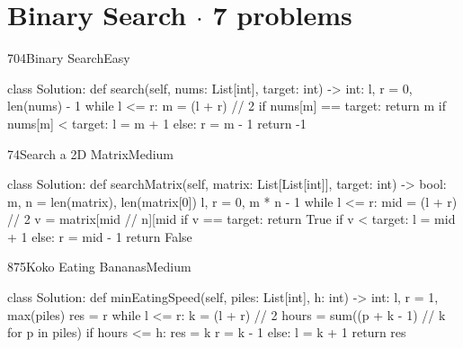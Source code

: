 \section{Binary Search {\normalsize\color{muted}$\cdot$ 7 problems}}

\begin{problem}{704}{Binary Search}{Easy}
\begin{code}
class Solution:
    def search(self, nums: List[int], target: int) -> int:
        l, r = 0, len(nums) - 1
        while l <= r:
            m = (l + r) // 2
            if nums[m] == target:
                return m
            if nums[m] < target:
                l = m + 1
            else:
                r = m - 1
        return -1
\end{code}
\end{problem}

\begin{problem}{74}{Search a 2D Matrix}{Medium}
\begin{code}
class Solution:
    def searchMatrix(self, matrix: List[List[int]], target: int) -> bool:
        m, n = len(matrix), len(matrix[0])
        l, r = 0, m * n - 1
        while l <= r:
            mid = (l + r) // 2
            v = matrix[mid // n][mid %
            if v == target:
                return True
            if v < target:
                l = mid + 1
            else:
                r = mid - 1
        return False
\end{code}
\end{problem}

\begin{problem}{875}{Koko Eating Bananas}{Medium}
\begin{code}
class Solution:
    def minEatingSpeed(self, piles: List[int], h: int) -> int:
        l, r = 1, max(piles)
        res = r
        while l <= r:
            k = (l + r) // 2
            hours = sum((p + k - 1) // k for p in piles)
            if hours <= h:
                res = k
                r = k - 1
            else:
                l = k + 1
        return res
\end{code}
\end{problem}

